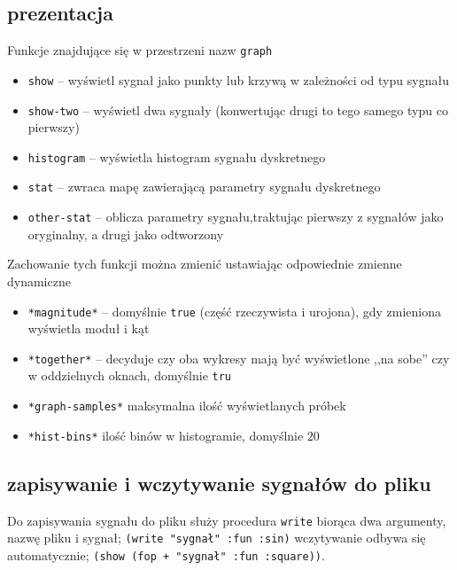 \documentclass[12pt]{article}
\newcommand{\cljt}[1]{\texttt{#1}}
\begin{document}
\subsection{prezentacja}
Funkcje znajdujące się w przestrzeni nazw \cljt{graph}
\begin{itemize}
	\item \cljt{show} -- wyświetl sygnał jako punkty lub krzywą w zależności od typu sygnału
	\item \cljt{show-two} -- wyświetl dwa sygnały (konwertując drugi to tego samego typu co pierwszy)
	\item \cljt{histogram} -- wyświetla histogram sygnału dyskretnego
	\item \cljt{stat} -- zwraca mapę zawierającą parametry sygnału dyskretnego
	\item \cljt{other-stat} -- oblicza parametry sygnału,traktując pierwszy z
	      sygnałów jako oryginalny, a drugi jako odtworzony
\end{itemize}
Zachowanie tych funkcji można zmienić ustawiając odpowiednie zmienne dynamiczne
\begin{itemize}
	\item \cljt{*magnitude*} -- domyślnie \cljt{true}
	      (część rzeczywista i urojona), gdy zmieniona wyświetla moduł i kąt
	\item \cljt{*together*} -- decyduje czy oba wykresy mają być wyświetlone ,,na
	      sobe'' czy w oddzielnych oknach, domyślnie \cljt{tru}

	\item \cljt{*graph-samples*} maksymalna ilość wyświetlanych próbek
	\item \cljt{*hist-bins*} ilość binów w histogramie, domyślnie $20$
\end{itemize}

\subsection{zapisywanie i wczytywanie sygnałów do pliku}
Do zapisywania sygnału do pliku służy procedura \cljt{write} biorąca dwa argumenty, nazwę pliku i sygnał;
\cljt{(write "sygnał" {:fun :sin})}
wczytywanie odbywa się automatycznie;
\cljt{(show (fop + "sygnał" {:fun :square}))}.
\end{document}
